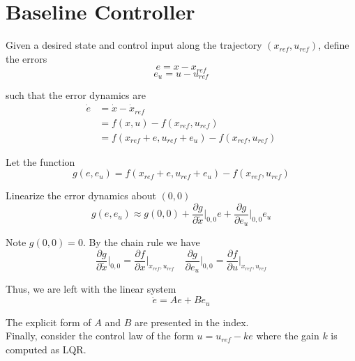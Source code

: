 \section{\textbf{Baseline Controller}}

\noindent Given a desired state and control input along the trajectory $(x_{ref}, u_{ref})$, define the errors
\[ e = x - x_{ref}\]
\[ e_u = u - u_{ref} \]

\noindent such that the error dynamics are
\[ \begin{aligned}
    \dot{e} &= \dot{x} - \dot{x}_{ref} \\
    &= f(x, u) - f(x_{ref}, u_{ref}) \\
    &= f(x_{ref} + e, u_{ref} + e_u) - f(x_{ref}, u_{ref})
\end{aligned} \]

\noindent Let the function
\[ g(e, e_u) = f(x_{ref} + e, u_{ref} + e_u) - f(x_{ref}, u_{ref}) \]

\noindent Linearize the error dynamics about $(0,0)$
\[ g(e, e_u) \approx g(0,0) + \frac{\partial g}{\partial \tilde x} \Bigg|_{0,0} e + \frac{\partial g}{\partial e_u} \Bigg|_{0,0} e_u \]

\noindent Note $g(0,0) = 0$. By the chain rule we have
\[ \frac{\partial g}{\partial \tilde x} \Bigg|_{0,0} = \frac{\partial f}{\partial x} \Bigg|_{x_{ref}, u_{ref}}
\quad
\frac{\partial g}{\partial e_u} \Bigg|_{0,0} = \frac{\partial f}{\partial u} \Bigg|_{x_{ref}, u_{ref}} \]

\noindent Thus, we are left with the linear system
\[ \dot{e} = Ae + B e_u\]

\noindent The explicit form of $A$ and $B$ are presented in the index. \\

\noindent Finally, consider the control law of the form $u = u_{ref} - ke$ where the gain $k$ is computed as LQR.
